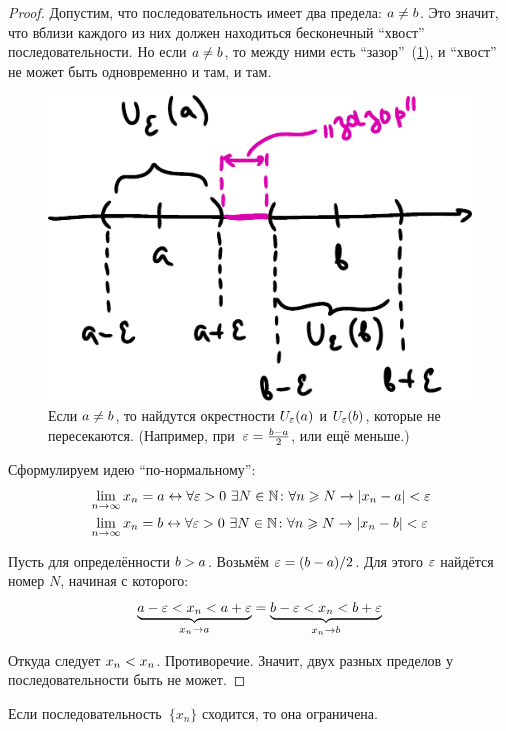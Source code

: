 \documentclass[a4paper,12pt]{article}
\begin{document}
  \begin{proof}
    Допустим, что последовательность имеет два предела: $a \hm{\not=} b$.
    Это значит, что вблизи каждого из них должен находиться бесконечный ``хвост'' последовательности.
    Но если $a \hm{\not=} b$, то между ними есть ``зазор''~(\ref{fig:a-not-eq-b}), и ``хвост'' не может быть одновременно и там, и там.
    
    \begin{figure}[ht]
      \centering
      \includegraphics[width=0.6\linewidth]{images/a-not-eq-b}
      
      \caption{
        Если $a \hm{\not=} b$, то найдутся окрестности $U_{\varepsilon}(a)$ и $U_{\varepsilon}(b)$, которые не пересекаются.
        (Например, при~$\eps \hm= \frac{b - a}{2}$, или ещё меньше.)
      }
      \label{fig:a-not-eq-b}
    \end{figure}
    
    Сформулируем идею ``по-нормальному'':
    \[
      \begin{aligned}
        &\lim_{n \to \infty} x_n = a \leftrightarrow \forall \varepsilon > 0\ \exists N \in \mathbb N\colon \forall n \geqslant N \to |x_n - a| < \varepsilon\\
        &\lim_{n \to \infty} x_n = b \leftrightarrow \forall \varepsilon > 0\ \exists N \in \mathbb N\colon \forall n \geqslant N \to |x_n - b| < \varepsilon
      \end{aligned}
    \]
    
    Пусть для определённости $b \hm> a$.
    Возьмём $\eps \hm= (b \hm- a) \hm/ 2$.
    Для этого $\varepsilon$ найдётся номер $N$, начиная с которого:
    \[
      \underbrace{a - \varepsilon < x_n < a + \varepsilon}_{x_n \to a} = \underbrace{b - \varepsilon < x_n < b + \varepsilon}_{x_n \to b}
    \]
    
    Откуда следует $x_n \hm< x_n$.
    Противоречие.
    Значит, двух разных пределов у последовательности быть не может.
  \end{proof}
  
  \begin{proposition}
    Если последовательность~$\{x_n\}$ сходится, то она ограничена.
  \end{proposition}
  
\end{document}

